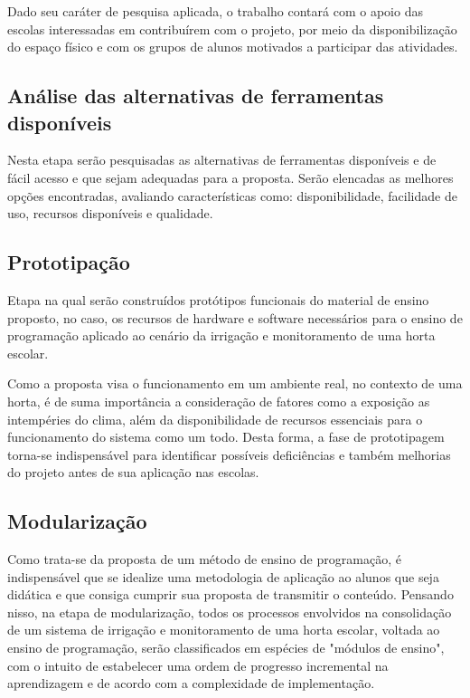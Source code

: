 \documentclass[12pt]{article}
\begin{document}
    Dado seu caráter de pesquisa aplicada, o trabalho contará com o apoio das escolas interessadas em contribuírem com o projeto, por meio da disponibilização do espaço físico e com os grupos de alunos motivados a participar das atividades.    
	
    \subsection{Análise das alternativas de ferramentas disponíveis}
    Nesta etapa serão pesquisadas as alternativas de ferramentas disponíveis e de fácil acesso e que sejam adequadas para a proposta. Serão elencadas as melhores opções encontradas, avaliando características como: disponibilidade, facilidade de uso, recursos disponíveis e qualidade.
    
    \subsection{Prototipação}
    Etapa na qual serão construídos protótipos funcionais do material de ensino proposto, no caso, os recursos de hardware e software necessários para o ensino de programação aplicado ao cenário da irrigação e monitoramento de uma horta escolar. 
    
    Como a proposta visa o funcionamento em um ambiente real, no contexto de uma horta, é de suma importância a consideração de fatores como a exposição as intempéries do clima, além da disponibilidade de recursos essenciais para o funcionamento do sistema como um todo. Desta forma, a fase de prototipagem torna-se indispensável para identificar possíveis deficiências e também melhorias do projeto antes de sua aplicação nas escolas.
    
    \subsection{Modularização}
    Como trata-se da proposta de um método de ensino de programação, é indispensável que se idealize uma metodologia de aplicação ao alunos que seja didática e que consiga cumprir sua proposta de transmitir o conteúdo. Pensando nisso, na etapa de modularização, todos os processos envolvidos na consolidação de um sistema de irrigação e monitoramento de uma horta escolar, voltada ao ensino de programação, serão classificados em espécies de "módulos de ensino", com o intuito de estabelecer uma ordem de progresso incremental na aprendizagem e de acordo com a complexidade de implementação. 
    
\end{document}
